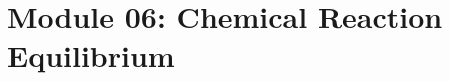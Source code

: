 \documentclass[12pts,a4paper,amsmath,amssymb,floatfix]{article}%
\begin{document}
\clearpage

\section{Module 06: Chemical Reaction Equilibrium}\label{Section:06}

\clearpage


\end{document}
